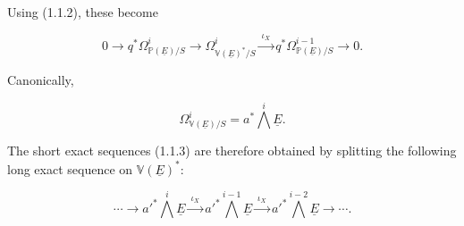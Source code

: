 Using (1.1.2), these become

\begin{equation}\tag{1.1.3}
0\longrightarrow q^*\Omega^i_{\mathbb P(\underline E)/S}
\longrightarrow\Omega^i_{\mathbb V(\underline E)^*/S}
\xrightarrow{\ \iota_X\ }
q^*\Omega^{i-1}_{\mathbb P(\underline E)/S}
\longrightarrow0.
\end{equation}

Canonically,

\begin{equation}\tag{1.1.4}
\Omega^i_{\mathbb V(\underline E)/S}
=a^*\bigwedge^i\underline E.
\end{equation}

The short exact sequences (1.1.3) are therefore obtained by splitting the
following long exact sequence on $\mathbb V(\underline E)^*$:

\begin{equation}\tag{1.1.5}
\cdots\longrightarrow {a'}^*\bigwedge^i\underline E
\xrightarrow{\ \iota_X\ }
{a'}^*\bigwedge^{i-1}\underline E
\xrightarrow{\ \iota_X\ }
{a'}^*\bigwedge^{i-2}\underline E\longrightarrow\cdots.
\end{equation}

